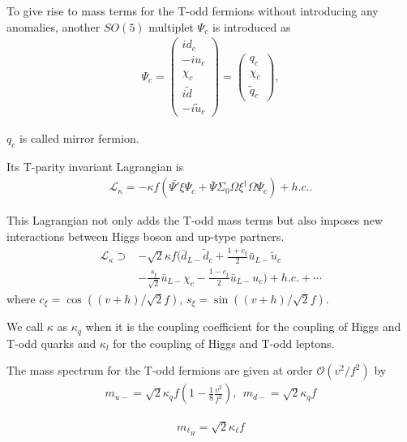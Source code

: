 To give rise to mass terms for the T-odd fermions without introducing any anomalies, 
another $SO(5)$ multiplet $\Psi_c$ is introduced as
\begin{align}
   \Psi_c = \left( \begin{array}{c}
  i d_c \\
  -iu_{c} \\
  \chi_{c} \\
  i \tilde{d}\\
  -i \tilde{u}_c
  \end{array}\right) 
  = \left( \begin{array}{c}
  q_c \\
  \chi_{c} \\
  \tilde{q}_c
  \end{array}\right), 
\end{align}

$q_c$ is called mirror fermion. 

Its T-parity invariant Lagrangian is 
\begin{align}
 \mathcal{L}_\kappa = 
 -\kappa f (\bar{\Psi'}\xi\Psi_c +\bar{\Psi}\Sigma_0 \Omega \xi^\dagger\Omega\Psi_c ) + h.c. .
\end{align}

This Lagrangian not only adds the T-odd mass terms but also 
imposes new interactions between Higgs boson and up-type partners.
\begin{align}
 \mathcal{L}_\kappa \supset &-\sqrt{2}\kappa f (
 \bar{d}_{L-}\tilde{d}_{c} + \frac{1+c_\xi}{2} \bar{u}_{L-} \tilde{u}_c  \nonumber\\
 &-\frac{s_\xi}{\sqrt{2}}\bar{u}_{L-} \chi_c -\frac{1-c_\xi}{2}\bar{u}_{L-} u_c )
 + h.c. + \cdots
\end{align}
where $c_\xi = \cos((v+h)/\sqrt{2}f)$, $s_\xi=\sin((v+h)/\sqrt{2}f)$. 

We call $\kappa$ as $\kappa_q$ when it is the coupling coefficient 
for the coupling of Higgs and T-odd quarks
and $\kappa_l$ for the coupling of Higgs and T-odd leptons.

The mass spectrum for the T-odd fermions are given at order $\mathcal{O}(v^2/f^2) $ by
\begin{align}
 m_{u-}=\sqrt{2}\kappa_q f (1-\frac{1}{8}\frac{v^2}{f^2}), ~~m_{d-}=\sqrt{2}\kappa_q f
 \label{eq:LHT:qH}
\end{align}

\begin{align}
 m_{\ell_H}=\sqrt{2}\kappa_\ell f
 \label{eq:LHT:lH}
\end{align}

